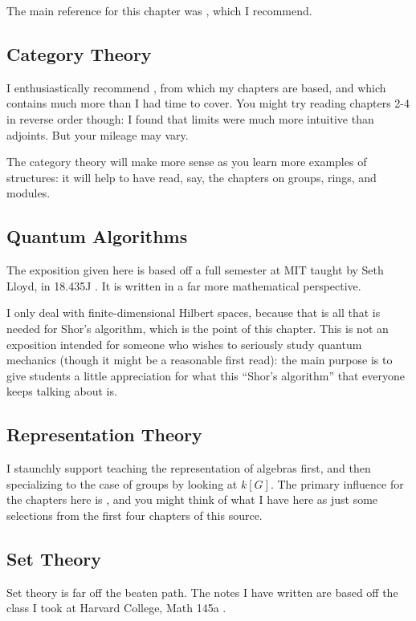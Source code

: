 The main reference for this chapter was \cite{ref:dartmouth}, which I recommend.

\subsection{Category Theory}
I enthusiastically recommend \cite{ref:msci},
from which my chapters are based,
and which contains much more than I had time to cover.
You might try reading chapters {2-4} in reverse order though:
I found that limits were much more intuitive than adjoints.
But your mileage may vary.

The category theory will make more sense as you learn
more examples of structures: it will help to have read,
say, the chapters on groups, rings, and modules.

\subsection{Quantum Algorithms}
The exposition given here is based off a full semester
at MIT taught by Seth Lloyd, in 18.435J \cite{ref:18-435}.
It is written in a far more mathematical perspective.

I only deal with finite-dimensional Hilbert spaces,
because that is all that is needed for Shor's algorithm,
which is the point of this chapter.
This is not an exposition intended for someone who wishes to seriously
study quantum mechanics (though it might be a reasonable first read):
the main purpose is to give students a little appreciation for
what this ``Shor's algorithm'' that everyone keeps talking about is.

\subsection{Representation Theory}
I staunchly support teaching the representation of algebras first,
and then specializing to the case of groups by looking at $k[G]$.
The primary influence for the chapters here is \cite{ref:etingof},
and you might think of what I have here as just some selections
from the first four chapters of this source.

\subsection{Set Theory}
Set theory is far off the beaten path.
The notes I have written are based off the class I took at Harvard College,
Math 145a \cite{ref:145a}.


